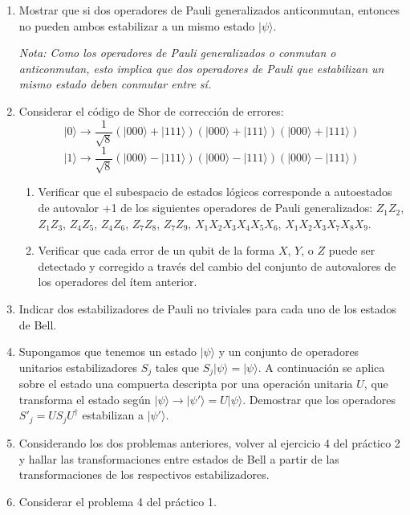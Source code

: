 \documentclass[a4paper,11pt,spanish]{article}
\newcommand{\ket}[1]{|#1\rangle}
\begin{document}
\begin{enumerate}
 \item Mostrar que si dos operadores de Pauli generalizados anticonmutan, entonces no pueden ambos estabilizar a un mismo estado $\ket{\psi}$.

 {\it Nota: Como los operadores de Pauli generalizados o conmutan o anticonmutan, esto implica que dos operadores de Pauli que estabilizan un mismo estado deben conmutar entre sí.}
 \medskip

 \item Considerar el c\'odigo de Shor de correcci\'on de errores:
 $$\ket{0} \to \frac{1}{\sqrt{8}}(\ket{000}+\ket{111})(\ket{000}+\ket{111})(\ket{000}+\ket{111})$$
 $$\ket{1} \to \frac{1}{\sqrt{8}}(\ket{000}-\ket{111})(\ket{000}-\ket{111})(\ket{000}-\ket{111})$$
 
 \begin{enumerate}
  \item Verificar que el subespacio de estados l\'ogicos corresponde a autoestados de autovalor +1 de los siguientes operadores de Pauli generalizados: $Z_1 Z_2$, $Z_1 Z_3$, $Z_4 Z_5$, $Z_4 Z_6$, $Z_7Z_8$, $Z_7Z_9$, $X_1X_2X_3X_4X_5X_6$, $X_1X_2X_3X_7X_8X_9$.
  \item Verificar que cada error de un qubit de la forma $X$, $Y$, o $Z$ puede ser detectado y corregido a trav\'es del cambio del conjunto de autovalores de los operadores del \'item anterior. 
 \end{enumerate}
 \medskip
 
 \item Indicar dos estabilizadores de Pauli no triviales para cada uno de los estados de Bell.
 \medskip

 \item Supongamos que tenemos un estado $\ket{\psi}$ y un conjunto de operadores unitarios estabilizadores $S_j$ tales que $S_j \ket{\psi} = \ket{\psi}$. A continuaci\'on se aplica sobre el estado una compuerta descripta por una operaci\'on unitaria $U$, que transforma el estado seg\'un $\ket{\psi}\to \ket{\psi'} = U\ket{\psi}$. Demostrar que los operadores $S'_j = U S_j U^\dagger$ estabilizan a $\ket{\psi'}$.
 \medskip

 \item Considerando los dos problemas anteriores, volver al ejercicio 4 del práctico 2 y hallar las transformaciones entre estados de Bell a partir de las transformaciones de los respectivos estabilizadores.
 \medskip
 \newpage

 \item Considerar el problema 4 del práctico 1. 


\end{enumerate}
\end{document}
